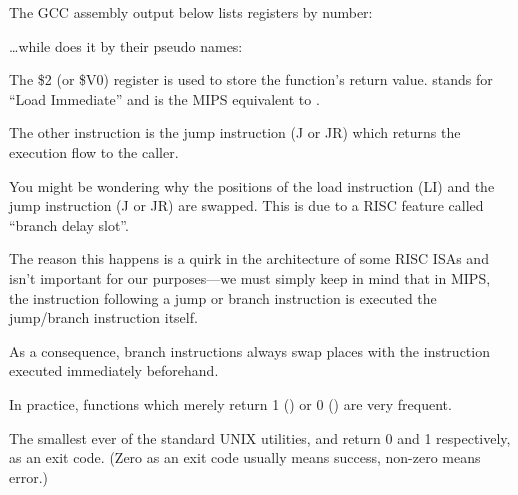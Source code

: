 The GCC assembly output below lists registers by number:



\dots while \IDA does it by their pseudo names:



The \$2 (or \$V0) register is used to store the function's return value.
 stands for ``Load Immediate'' and is the MIPS equivalent to \MOV.

The other instruction is the jump instruction (J or JR) which returns the execution flow to the \gls{caller}.

You might be wondering why the positions of the load instruction (LI) and the jump instruction (J or JR) are swapped. This is due to a \ac{RISC} feature called ``branch delay slot''.

The reason this happens is a quirk in the architecture of some RISC \ac{ISA}s and isn't important for our
purposes---we must simply keep in mind that in MIPS, the instruction following a jump or branch instruction
is executed  the jump/branch instruction itself.

As a consequence, branch instructions always swap places with the instruction executed immediately beforehand.


In practice, functions which merely return 1 () or 0 () are very frequent.

The smallest ever of the standard UNIX utilities,  and  return 0 and 1 respectively, as an exit code.
(Zero as an exit code usually means success, non-zero means error.)
